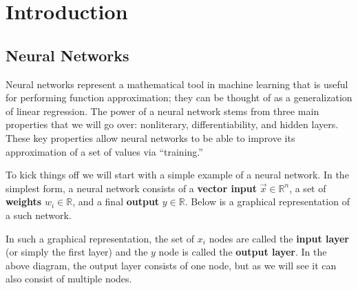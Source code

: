 \documentclass[12pt,letterpaper]{book}
\theoremstyle{definition}
\begin{document}
 
  \chapter{Introduction}
  \section{Neural Networks}
  Neural networks represent a mathematical tool in machine learning that is useful for performing function 
  approximation; they can be thought of as a generalization of linear regression. The power of a neural network stems 
  from three main properties that we will go over: nonliterary, differentiability, and hidden layers.
  These key properties allow neural networks to be able to improve its approximation of a set of values via ``training.'' 

  To kick things off we will start with a simple example of a neural network.
  In the simplest form, a neural network consists of a \textbf{vector input} $\vec{x} \in \mathbb{R}^n$, a set 
  of \textbf{weights} $w_i \in \mathbb{R}$, and a final \textbf{output} $y \in \mathbb{R}$.
  Below is a graphical representation of a such network. 
  \begin{center}
  \end{center}
  In such a graphical representation, the set of $x_i$ nodes are called the \textbf{input layer} (or simply the first layer)
  and the $y$ node is called the \textbf{output layer}. In the above diagram, the output layer 
  consists of one node, but as we will see it can also consist of multiple nodes.
\end{document}

